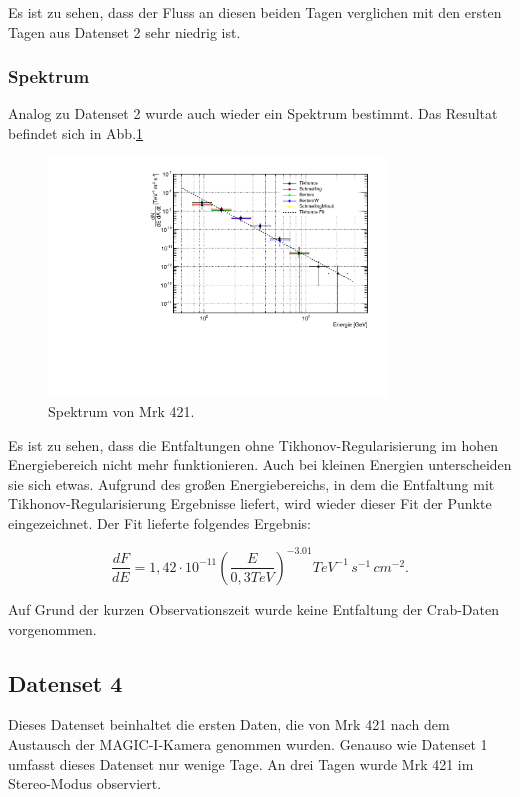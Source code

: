 Es ist zu sehen, dass der Fluss an diesen beiden Tagen verglichen mit den ersten Tagen aus Datenset 2 sehr niedrig ist.



\FloatBarrier

\subsubsection{Spektrum}
Analog zu Datenset 2 wurde auch wieder ein Spektrum bestimmt.
Das Resultat befindet sich in Abb.\ref{Datenset1_Spektrum_Mrk421}

\begin{figure}
    \centering
    \includegraphics[width=0.8\textwidth]{./Plots/04_MrkAnalyse/Datenset1/Spektrum_Mrk421.pdf}
    \caption{Spektrum von Mrk 421.}
    \label{Datenset1_Spektrum_Mrk421}
\end{figure}

Es ist zu sehen, dass die Entfaltungen ohne Tikhonov-Regularisierung im hohen Energiebereich nicht mehr funktionieren.
Auch bei kleinen Energien unterscheiden sie sich etwas.
Aufgrund des großen Energiebereichs, in dem die Entfaltung mit Tikhonov-Regularisierung Ergebnisse liefert, wird wieder dieser Fit der Punkte eingezeichnet.
Der Fit lieferte folgendes Ergebnis:

\begin{equation}
 \frac{dF}{dE}=1,42 \cdot 10^{-11}\left( \frac{E}{0,3 \si{TeV}} \right)^{-3.01} \si{TeV^{-1}\,s^{-1}\,cm^{-2}}.
\end{equation}

Auf Grund der kurzen Observationszeit wurde keine Entfaltung der Crab-Daten vorgenommen.

\FloatBarrier

\subsection{Datenset 4}
\label{subsec:Datenset_4}
Dieses Datenset beinhaltet die ersten Daten, die von Mrk 421 nach dem Austausch der MAGIC-I-Kamera genommen wurden. 
Genauso wie Datenset 1 umfasst dieses Datenset nur wenige Tage. 
An drei Tagen wurde Mrk 421 im Stereo-Modus observiert. 


